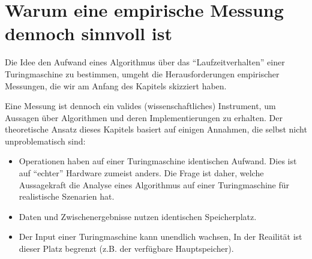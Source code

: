 \section{Warum eine empirische Messung dennoch sinnvoll ist}
Die Idee den Aufwand eines Algorithmus über das ``Laufzeitverhalten'' einer Turingmaschine zu bestimmen,
umgeht die Herausforderungen empirischer Messungen, die wir am Anfang des Kapitels skizziert haben.

Eine Messung ist dennoch ein valides (wissenschaftliches) Instrument,
um Aussagen über Algorithmen und deren Implementierungen zu erhalten.
Der theoretische Ansatz dieses Kapitels basiert auf einigen Annahmen,
die selbst nicht unproblematisch sind:
\begin{itemize}
  \item Operationen haben auf einer Turingmaschine identischen Aufwand.
    Dies ist auf ``echter'' Hardware zumeist anders.
    Die Frage ist daher, welche Aussagekraft die Analyse eines Algorithmus auf einer Turingmaschine für realistische Szenarien hat. 
  \item Daten und Zwischenergebnisse nutzen identischen Speicherplatz.
  \item Der Input einer Turingmaschine kann unendlich wachsen,
      In der Reailität ist dieser Platz begrenzt (z.B. der verfügbare Hauptspeicher).
\end{itemize}
